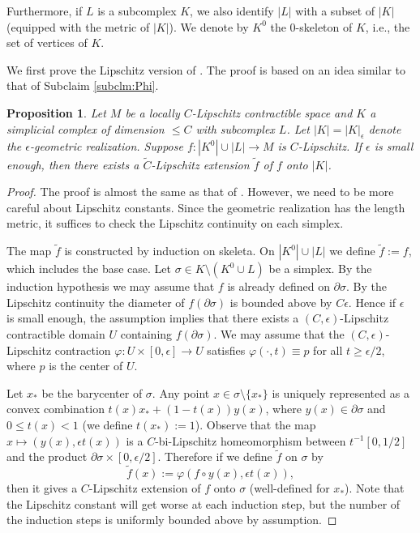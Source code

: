 \documentclass[a4paper,12pt]{amsart}
\theoremstyle{plain}
\newtheorem{prop}[thm]{Proposition}
\theoremstyle{definition}
\numberwithin{thm}{section}
\numberwithin{equation}{section}
\begin{document}
Furthermore, if $L$ is a subcomplex $K$, we also identify $|L|$ with a subset of $|K|$ (equipped with the metric of $|K|$).
We denote by $K^0$ the $0$-skeleton of $K$, i.e., the set of vertices of $K$.

We first prove the Lipschitz version of \cite[\S2, Main Lemma]{Peter}.
The proof is based on an idea similar to that of Subclaim \ref{subclm:Phi}.

\begin{prop}\label{prop:simp}
Let $M$ be a locally $C$-Lipschitz contractible space and $K$ a simplicial complex of dimension $\le C$ with subcomplex $L$.
Let $|K|=|K|_\epsilon$ denote the $\epsilon$-geometric realization.
Suppose $f:|K^0|\cup|L|\to M$ is $C$-Lipschitz.
If $\epsilon$ is small enough, then there exists a $\tilde C$-Lipschitz extension $\tilde f$ of $f$ onto $|K|$.
\end{prop}

\begin{proof}
The proof is almost the same as that of \cite[\S2, Main Lemma]{Peter}.
However, we need to be more careful about Lipschitz constants.
Since the geometric realization has the length metric, it suffices to check the Lipschitz continuity on each simplex.

The map $\tilde f$ is constructed by induction on skeleta.
On $|K^0|\cup|L|$ we define $\tilde f:=f$, which includes the base case.
Let $\sigma\in K\setminus(K^0\cup L)$ be a simplex.
By the induction hypothesis we may assume that $f$ is already defined on $\partial\sigma$.
By the Lipschitz continuity the diameter of $f(\partial\sigma)$ is bounded above by $C\epsilon$.
Hence if $\epsilon$ is small enough, the assumption implies that there exists a $(C,\epsilon)$-Lipschitz contractible domain $U$ containing $f(\partial\sigma)$.
We may assume that the $(C,\epsilon)$-Lipschitz contraction $\varphi:U\times[0,\epsilon]\to U$ satisfies $\varphi(\cdot,t)\equiv p$ for all $t\ge\epsilon/2$, where $p$ is the center of $U$.

Let $x_\ast$ be the barycenter of $\sigma$.
Any point $x\in\sigma\setminus\{x_\ast\}$ is uniquely represented as a convex combination $t(x)x_\ast+(1-t(x))y(x)$, where $y(x)\in\partial\sigma$ and $0\le t(x)<1$ (we define $t(x_\ast):=1$).
Observe that the map $x\mapsto(y(x),\epsilon t(x))$ is a $C$-bi-Lipschitz homeomorphism between $t^{-1}[0,1/2]$ and the product $\partial\sigma\times[0,\epsilon/2]$.
Therefore if we define $\tilde f$ on $\sigma$ by
\[\tilde f(x):=\varphi(f\circ y(x),\epsilon t(x)),\]
then it gives a $C$-Lipschitz extension of $f$ onto $\sigma$ (well-defined for $x_\ast$).
Note that the Lipschitz constant will get worse at each induction step, but the number of the induction steps is uniformly bounded above by assumption.
\end{proof}
\end{document}
